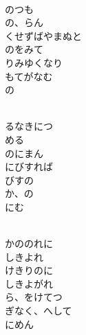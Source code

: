 \documentclass[10pt,b5j]{tarticle} %
\begin{document}
\begin{enumerate}
\begin{minipage}[c]{\blocksize}
    \end{minipage}
    \begin{minipage}[c]{\blocksize}
        
        \vspace{\linespace}
        \item~\\
        のつも\\
        の、らん\\
        くせずばやまぬと\\
        のをみて\\
        りみゆくなり\\
        もてがなむ\\
        の
        
    \end{minipage}
    \begin{minipage}[c]{\blocksize}
        
        \vspace{\linespace}
        \item~\\
        るなきにつ\\
        める\\
        のにまん\\
        にびすれば\\
        びすの\\
        か、の\\
        にむ
        
    \end{minipage}
    \begin{minipage}[c]{\blocksize}
        
        \vspace{\linespace}
        \item~\\
        かののれに\\
        しきよれ\\
        けきりのに\\
        しきよがれ\\
        ら、をけてつ\\
        ぎなく、へして\\
        にめん
        

\end{minipage}
\end{enumerate}
\end{document}
